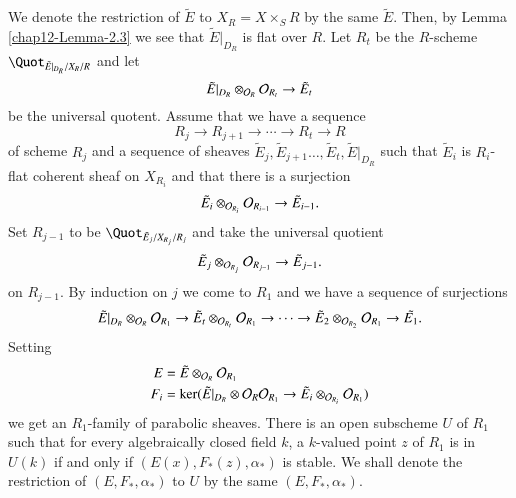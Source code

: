 We denote the restriction of $\tilde{E}$ to $X_{R}=X \times_{S} R $ by the same $\tilde{E}$. Then, by Lemma
\ref{chap12-Lemma-2.3} we see that $\tilde{E}|_{D_{R}}$ is flat over $R$. Let $R_{t}$ be the $R$-scheme $\Quot_{\tilde{E}|_{D_{R}}/X_{R}/R}$ and let
$$
\tilde{E}|_{D_{R}} \otimes_{\mathcal{O}_{R}}\mathcal{O}_{R_{t}} \rightarrow \tilde{E}_{t}
$$ 
be the universal quotent. Assume that we have a sequence
$$
R_{j}\rightarrow R_{j+1} \rightarrow \cdots \rightarrow R_{t} \rightarrow R
$$
of scheme $R_{j}$ and a sequence of sheaves $\tilde{E}_{j}, \tilde{E}_{j+1}\ldots, \tilde{E}_{t}, \tilde{E}|_{D_{R}}$ such that $\tilde{E}_{i}$ is $R_{i}$-flat coherent sheaf on $X_{R_{i}}$ and that there is a surjection
$$
\tilde{E}_{i}\otimes_{\mathcal{O}_{R_{i}}}\mathcal{O}_{R_{i-1}} \rightarrow \tilde{E}_{i-1}.
$$
Set $R_{j-1}$ to be $\Quot_{\tilde{E}_{j}/X_{R_{j}}/R_{j}}$ and take the universal quotient
$$
\tilde{E}_{j} \otimes_{\mathcal{O}_{R_{j}}} \mathcal{O}_{R_{j-1}} \rightarrow \tilde{E}_{j-1}.
$$
on $R_{j-1}$. By induction on $j$ we come to $R_{1}$ and we have a sequence of surjections
$$
\tilde{E}|_{D_{R}}\otimes_{\mathcal{O}_{R}}\mathcal{O}_{R_{1}} \rightarrow \tilde{E}_{t}\otimes_{\mathcal{O}_{R_{t}}}\mathcal{O}_{R_{1}} \rightarrow \cdots \rightarrow \tilde{E}_{2}\otimes_{\mathcal{O}_{R_{2}}} \mathcal{O}_{R_{1}}\rightarrow \tilde{E_{1}}.
$$
Setting
\begin{align*}
E&=\tilde{E}\otimes_{\mathcal{O}_{R}} \mathcal{O}_{R_{1}}\\
F_{i}&=\ker(\tilde{E}|_{D_{R}} \otimes\mathcal{O}_{R} \mathcal{O}_{R_{1}} \rightarrow \tilde{E}_{i}\otimes_{\mathcal{O}_{R_{i}}} \mathcal{O}_{R_{1}})
\end{align*}
we get an $R_{1}$-family of parabolic sheaves. There is an open subscheme $U$ of $R_{1}$ such that for every algebraically closed field $k$, a $k$-valued point $z$ of $R_{1}$ is in $U(k)$ if and only if $(E(x), F_{*}(z), \alpha_{*})$ is stable. We shall denote the restriction of $(E, F_{*}, \alpha_{*})$ to $U$ by the same $(E, F_{*}, \alpha_{*})$.

